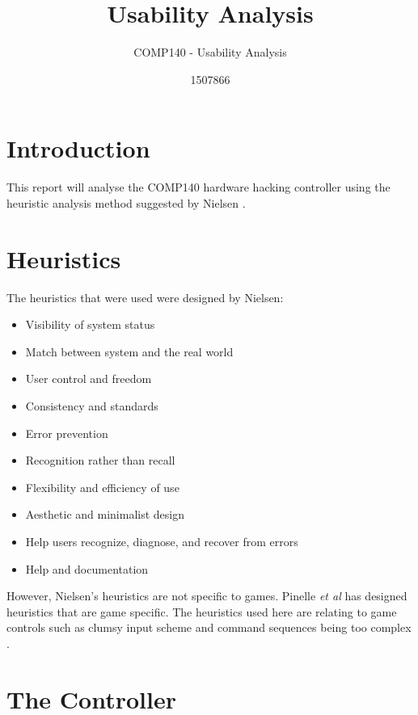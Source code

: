 \documentclass{scrartcl}
\title{Usability Analysis}
\subtitle{COMP140 - Usability Analysis}
\author{1507866}
\begin{document}
	
\maketitle


\section{Introduction}
This report will analyse the COMP140 hardware hacking controller using the heuristic analysis method suggested by Nielsen \cite{HeuristicEvaluation}.


\section{Heuristics}
The heuristics that were used were designed by Nielsen:

\begin{itemize}
	\item Visibility of system status
	\item Match between system and the real world
	\item User control and freedom	
	\item Consistency and standards
	\item Error prevention
	\item Recognition rather than recall
	\item Flexibility and efficiency of use
	\item Aesthetic and minimalist design
	\item Help users recognize, diagnose, and recover from errors	
	\item Help and documentation \cite{NNG}
\end{itemize}

However, Nielsen's heuristics are not specific to games. Pinelle \textit{et al} has designed heuristics that are game specific. The heuristics used here are relating to game controls such as clumsy input scheme and command sequences being too complex \cite{Pinelle}.

\section{The Controller}
\end{document}
